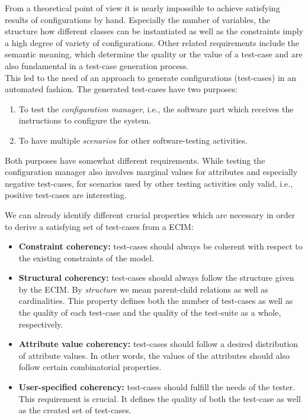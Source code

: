 From a theoretical point of view it is nearly impossible to achieve satisfying results of configurations by hand. Especially the number of variables, the structure how different classes can be instantiated as well as the constraints imply a high degree of variety of configurations. Other related requirements include the semantic meaning, which determine the quality or the value of a test-case and are also fundamental in a test-case generation process.\\

This led to the need of an approach to generate configurations (test-cases) in an automated fashion. The generated test-cases have two purposes:
\begin{enumerate}
 \item To test the \emph{configuration manager}, i.e., the software part which receives the instructions to configure the system.
 \item To have multiple \emph{scenarios} for other software-testing activities.
\end{enumerate}

Both purposes have somewhat different requirements. While testing the configuration manager also involves marginal values for attributes and especially negative test-cases, for scenarios used by other testing activities only valid, i.e., positive test-cases are interesting.

We can already identify different crucial properties which are necessary in order to derive a satisfying set of test-cases from a ECIM:
\begin{itemize}
 \item \textbf{Constraint coherency:} test-cases should always be coherent with respect to the existing constraints of the model.
 
 \item \textbf{Structural coherency:} test-cases should always follow the structure given by the ECIM. By \emph{structure} we mean parent-child relations as well as cardinalities. This property defines both the number of test-cases as well as the quality of each test-case and the quality of the test-suite as a whole, respectively.
 
 \item \textbf{Attribute value coherency:} test-cases should follow a desired distribution of attribute values. In other words, the values of the attributes should also follow certain combinatorial properties.
 
 \item \textbf{User-specified coherency:} test-cases should fulfill the needs of the tester. This requirement is crucial. It defines the quality of both the test-case as well as the created set of test-cases.
\end{itemize}

